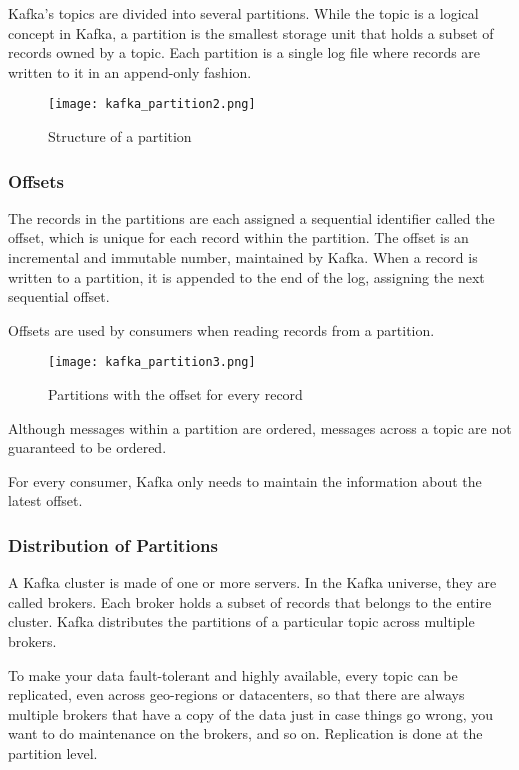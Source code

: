 Kafka's topics are divided into several partitions. While the topic is a
logical concept in Kafka, a partition is the smallest storage unit that holds
a subset of records owned by a topic. Each partition is a single log file
where records are written to it in an append-only fashion.

\begin{figure}[ht]
    \centering
    \texttt{[image: kafka\_partition2.png]}
    \caption{Structure of a partition}
\end{figure}

\subsubsection{Offsets}

The records in the partitions are each assigned a sequential identifier
called the offset, which is unique for each record within the partition.
The offset is an incremental and immutable number, maintained by Kafka.
When a record is written to a partition, it is appended to the end of the log,
assigning the next sequential offset.

Offsets are used by consumers when reading records from a partition.

\begin{figure}[ht]
    \centering
    \texttt{[image: kafka\_partition3.png]}
    \caption{Partitions with the offset for every record}
\end{figure}

Although messages within a partition are ordered, messages across a topic are
not guaranteed to be ordered.

For every consumer, Kafka only needs to maintain the information about the
latest offset.

\subsubsection{Distribution of Partitions}

A Kafka cluster is made of one or more servers. In the Kafka universe, they are
called brokers.
Each broker holds a subset of records that belongs to the entire cluster.
Kafka distributes the partitions of a particular topic across multiple brokers.

To make your data fault-tolerant and highly available, every topic can be
replicated, even across geo-regions or datacenters, so that there are always
multiple brokers that have a copy of the data just in case things go wrong, you
want to do maintenance on the brokers, and so on.
Replication is done at the partition level.


